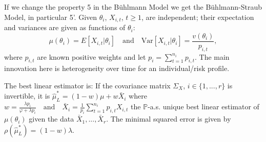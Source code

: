 If we change the property 5 in the Bühlmann Model we get the Bühlmann-Straub Model, in particular
5'. Given \(\theta_i\), \(X_{i,t}\), \(t \ge 1\), are independent; their expectation and variances are given as functions of \(\theta_i\):
\[
\mu(\theta_i) = E[X_{i,t} | \theta_i] \quad \text{and} \quad \text{Var}[X_{i,t} | \theta_i] = \frac{v(\theta_i)}{p_{i,t}},
\]
where \(p_{i,t}\) are known positive weights and let \( p_i = \sum_{t=1}^{n_i} p_{i,t} \).
The main innovation here is heterogeneity over time for an individual/risk profile.

The best linear estimator is:
If the covariance matrix \(\Sigma_X\), \(i \in \{1, ..., r\}\) is invertible, it is
\(
\hat{\mu}_L^{\ast} = (1 - w) \mu + w \bar{X}_i
\)
where
\(
w = \frac{\lambda p_i}{\varphi + \lambda p_i} \quad \text{and} \quad \bar{X}_i = \frac{1}{p_i} \sum_{t=1}^{n_i} p_{i,t} X_{i,t}
\)
the \(\mathbb{P}\)-a.s. unique best linear estimator of \(\mu(\theta_i)\) given the data \(\bar{X}_1, ..., \bar{X}_r\). 
The minimal squared error is given by
\(
\rho(\hat{\mu}_L^{\ast}) = (1 - w) \lambda.
\)

